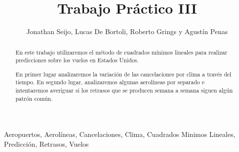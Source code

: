 \documentclass{endm}
\begin{document}
\setlength{\abovedisplayskip}{1cm}
\setlength{\belowdisplayskip}{1cm}

\begin{frontmatter}


\title{Trabajo Práctico III}

\author{Jonathan Seijo, Lucas De Bortoli, Roberto Grings y Agustín Penas}
\address{Departamento de computación\\ Universidad de Buenos Aires\\ Buenos Aires, Argentina\\}


\begin{abstract}

En este trabajo utilizaremos el método de cuadrados mínimos lineales para realizar predicciones sobre los vuelos en Estados Unidos.

En primer lugar analizaremos la variación de las cancelaciones por clima a través del tiempo. En segundo lugar, analizaremos algunas aerolíneas por separado e intentaremos averiguar si los retrasos que se producen semana a semana siguen algún patrón común.
\end{abstract}

\begin{keyword}
Aeropuertos, Aerolíneas, Cancelaciones, Clima, Cuadrados Minimos Lineales, Predicción, Retrasos, Vuelos
\end{keyword}

\end{frontmatter}

\newpage


\newpage

\end{document}
